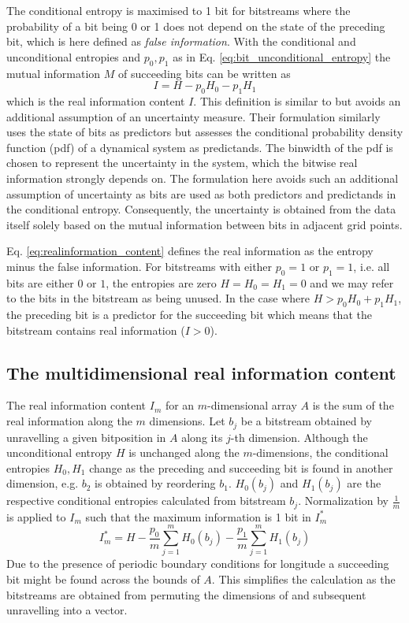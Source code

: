 The conditional entropy is maximised to 1 bit for bitstreams where the probability of a bit being 0 or 1 does not depend on the state of the
preceding bit, which is here defined as \emph{false information}. With the conditional and unconditional entropies and $p_0,p_1$ as in
Eq. \ref{eq:bit_unconditional_entropy} the mutual information $M$ of succeeding bits can be written as
	\begin{equation}
	I = H - p_0H_0 - p_1H_1
	\label{eq:realinformation_content}
	\end{equation}
which is the real information content $I$. This definition is similar to \cite{Jeffress2017a} but avoids an additional assumption of an uncertainty
measure. Their formulation similarly uses the state of bits as predictors but assesses the conditional probability density function (pdf) of a
dynamical system as predictands. The binwidth of the pdf is chosen to represent the uncertainty in the system, which the bitwise real information
strongly depends on. The formulation here avoids such an additional assumption of uncertainty as bits are used as both predictors and
predictands in the conditional entropy. Consequently, the uncertainty is obtained from the data itself solely based on the mutual information
between bits in adjacent grid points.

Eq. \ref{eq:realinformation_content} defines the real information as the entropy minus the false information. For bitstreams with either $p_0 = 1$
or $p_1=1$, i.e. all bits are either $0$ or $1$, the entropies are zero $H = H_0 = H_1 = 0$ and we may refer to the bits in the bitstream as being unused.
In the case where $H > p_0H_0 + p_1H_1$, the preceding bit is a predictor for the succeeding bit which means that the bitstream contains
real information ($I > 0$).

\subsection{The multidimensional real information content}

The real information content $I_m$ for an $m$-dimensional array $A$ is the sum of the real information along the $m$ dimensions.
Let $b_j$ be a bitstream obtained by unravelling a given bitposition in $A$ along its $j$-th dimension. 
Although the unconditional entropy $H$ is unchanged along the $m$-dimensions, the conditional entropies $H_0,H_1$ change as the
preceding and succeeding bit is found in another dimension, e.g. $b_2$ is obtained by reordering $b_1$. $H_0(b_j)$ and $H_1(b_j)$
are the respective conditional entropies calculated from bitstream $b_j$. Normalization by $\tfrac{1}{m}$  is applied to $I_m$ such
that the maximum information is 1 bit in $I_m^*$
	\begin{equation}
	I_m^* = H - \frac{p_0}{m} \sum_{j=1}^mH_0(b_j) - \frac{p_1}{m}\sum_{j=1}^mH_1(b_j)
	\end{equation}
Due to the presence of periodic boundary conditions for longitude a succeeding bit might be found across the bounds of $A$.
This simplifies the calculation as the bitstreams are obtained from permuting the dimensions of  and subsequent unravelling into a vector.

